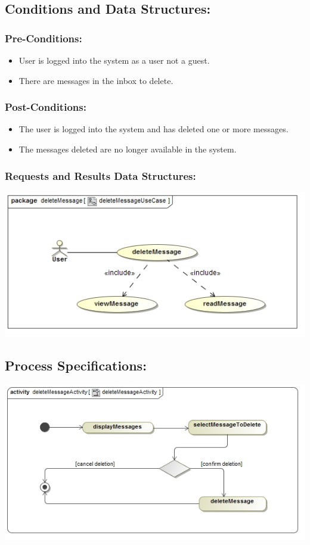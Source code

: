 \documentclass[a4paper,11pt]{article}
\begin{document}
\subsection{Conditions and Data Structures:}
\subsubsection*{Pre-Conditions:}
\begin{itemize}
\item User is logged into the system as a user not a guest. 
\item There are messages in the inbox to delete.
\end{itemize}
\subsubsection*{Post-Conditions:}
\begin{itemize}
\item The user is logged into the system and has deleted one or more messages.
\item The messages deleted are no longer available in the system.
\end{itemize}
\subsubsection*{Requests and Results Data Structures:}
\includegraphics[width=1\linewidth]{./Images/PrivateMessage/deleteMessageUseCase}
\subsection{Process Specifications:} 
\includegraphics[width=1\linewidth]{./Images/PrivateMessage/deleteMessageActivity}
\end{document}

